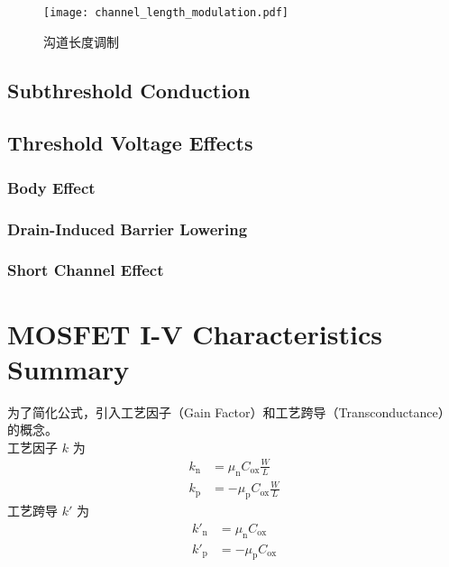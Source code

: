 \begin{figure}
    \centering
    \texttt{[image: channel\_length\_modulation.pdf]}
    \caption{沟道长度调制\cite{NeamenSemiconductor}}
    \label{fig:channel_length_modulation}
\end{figure}

\subsection{Subthreshold Conduction}

\subsection{Threshold Voltage Effects}
\subsubsection{Body Effect}

\subsubsection{Drain-Induced Barrier Lowering}

\subsubsection{Short Channel Effect}

\section{MOSFET I-V Characteristics Summary}

为了简化公式，引入工艺因子（Gain Factor）和工艺跨导（Transconductance）的概念。\\
工艺因子 $k$ 为
\begin{equation}
    \begin{aligned}
        k_{\mathrm{n}} &= \mu_{\mathrm{n}} C_{\mathrm{ox}} \frac{W}{L} \\
        k_{\mathrm{p}} &= -\mu_{\mathrm{p}} C_{\mathrm{ox}} \frac{W}{L}
    \end{aligned}
\end{equation}
工艺跨导 $k'$ 为
\begin{equation}
    \begin{aligned}
        k'_{\mathrm{n}} &= \mu_{\mathrm{n}} C_{\mathrm{ox}} \\
        k'_{\mathrm{p}} &= -\mu_{\mathrm{p}} C_{\mathrm{ox}}
    \end{aligned}
\end{equation}

